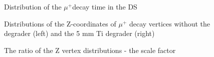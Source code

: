\begin{figure}[H]
  \caption{
    \label{figure:dif_proper_time_constraints}
    Distribution of the $\mu^+$decay time in the DS
  }
\end{figure}

\begin{figure}[H]
  \caption{
    \label{fig:pion_stop_time}
    Distributions of the Z-coordinates of $\mu^+$ decay vertices without the degrader (left)
    and the 5 mm Ti degrader (right)
  }
\end{figure}

\begin{figure}[H]
  \caption{
    \label{fig:pion_stop_time}
    The ratio of the Z vertex distributions - the scale factor
  }
\end{figure}


